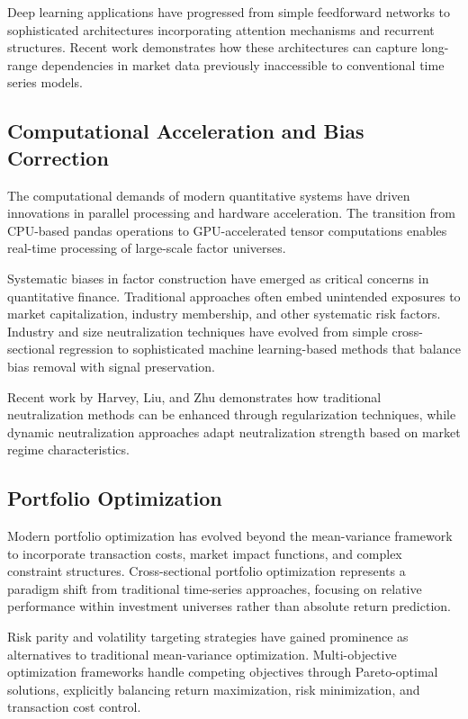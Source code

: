 \documentclass[conference]{IEEEtran}
\begin{document}
Deep learning applications have progressed from simple feedforward networks to sophisticated architectures incorporating attention mechanisms and recurrent structures. Recent work demonstrates how these architectures can capture long-range dependencies in market data previously inaccessible to conventional time series models.

\subsection{Computational Acceleration and Bias Correction}

The computational demands of modern quantitative systems have driven innovations in parallel processing and hardware acceleration. The transition from CPU-based pandas operations to GPU-accelerated tensor computations enables real-time processing of large-scale factor universes.

Systematic biases in factor construction have emerged as critical concerns in quantitative finance. Traditional approaches often embed unintended exposures to market capitalization, industry membership, and other systematic risk factors. Industry and size neutralization techniques have evolved from simple cross-sectional regression to sophisticated machine learning-based methods that balance bias removal with signal preservation.

Recent work by Harvey, Liu, and Zhu demonstrates how traditional neutralization methods can be enhanced through regularization techniques, while dynamic neutralization approaches adapt neutralization strength based on market regime characteristics.

\subsection{Portfolio Optimization}

Modern portfolio optimization has evolved beyond the mean-variance framework to incorporate transaction costs, market impact functions, and complex constraint structures. Cross-sectional portfolio optimization represents a paradigm shift from traditional time-series approaches, focusing on relative performance within investment universes rather than absolute return prediction.

Risk parity and volatility targeting strategies have gained prominence as alternatives to traditional mean-variance optimization. Multi-objective optimization frameworks handle competing objectives through Pareto-optimal solutions, explicitly balancing return maximization, risk minimization, and transaction cost control.
\end{document}
